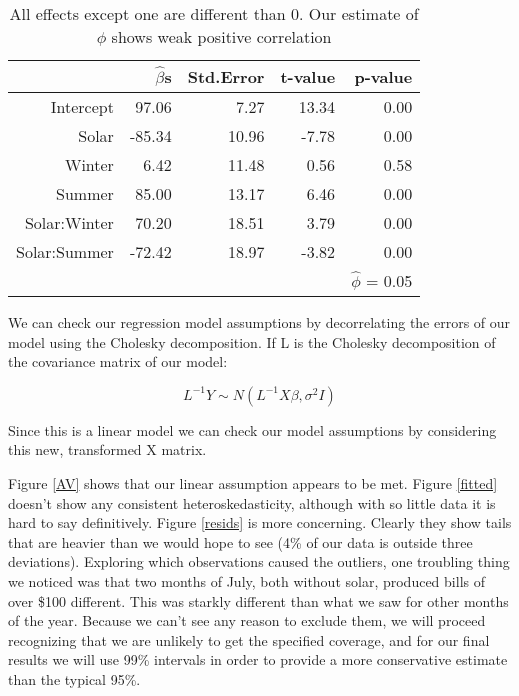 \documentclass{svproc}
\begin{document}
\begin{table}[ht]
\centering
\begin{tabular}{rrrrr}
  \hline
 & $\hat{\beta}$s & Std.Error & t-value & p-value \\ 
  \hline
Intercept & 97.06 & 7.27 & 13.34 & 0.00 \\ 
  Solar & -85.34 & 10.96 & -7.78 & 0.00 \\ 
  Winter & 6.42 & 11.48 & 0.56 & 0.58 \\ 
  Summer & 85.00 & 13.17 & 6.46 & 0.00 \\ 
  Solar:Winter & 70.20 & 18.51 & 3.79 & 0.00 \\ 
  Solar:Summer& -72.42 & 18.97 & -3.82 & 0.00 \\ 
   \hline
  &&&& $\hat{\phi}$ = 0.05 \\
\hline
\end{tabular}
\caption{All effects except one are different than 0. Our estimate of $\phi$ shows weak positive correlation}
\label{summaryTab}
\end{table}

We can check our regression model assumptions by decorrelating the errors of our model using the Cholesky decomposition. If L is the Cholesky decomposition of the covariance matrix of our model:

\begin{equation}
L^{-1}Y \sim N(L^{-1}X\beta, \sigma^2I)
\end{equation}

Since this is a linear model we can check our model assumptions by considering this new, transformed X matrix.

Figure \ref{AV} shows that our linear assumption appears to be met. Figure \ref{fitted} doesn't show any consistent heteroskedasticity, although with so little data it is hard to say definitively. Figure \ref{resids} is more concerning. Clearly they show tails that are heavier than we would hope to see (4\% of our data is outside three deviations). Exploring which observations caused the outliers, one troubling thing we noticed was that two months of July, both without solar, produced bills of over \$100 different. This was starkly different than what we saw for other months of the year. Because we can't see any reason to exclude them, we will proceed recognizing that we are unlikely to get the specified coverage, and for our final results we will use 99\% intervals in order to provide a more conservative estimate than the typical 95\%. 
\end{document}
